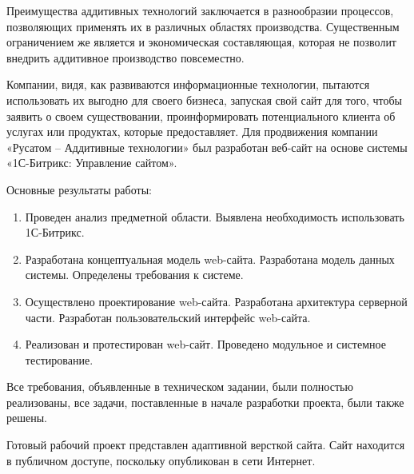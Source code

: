 
Преимущества аддитивных технологий заключается в разнообразии процессов, позволяющих применять их в различных областях производства. Существенным ограничением же является и экономическая составляющая, которая не позволит внедрить аддитивное производство повсеместно.
  
Компании, видя, как развиваются информационные технологии, пытаются использовать их выгодно для своего бизнеса, запуская свой сайт для того, чтобы заявить о своем существовании, проинформировать потенциального клиента об услугах или продуктах, которые предоставляет. 
Для продвижения компании «Русатом – Аддитивные технологии» был разработан веб-сайт на основе системы «1С-Битрикс: Управление сайтом».

Основные результаты работы:

\begin{enumerate}
\item Проведен анализ предметной области. Выявлена необходимость использовать 1С-Битрикс.
\item Разработана концептуальная модель web-сайта. Разработана модель данных системы. Определены требования к системе.
\item Осуществлено проектирование web-сайта. Разработана архитектура серверной части. Разработан пользовательский интерфейс web-сайта.
\item Реализован и протестирован web-сайт. Проведено модульное и системное тестирование.
\end{enumerate}

Все требования, объявленные в техническом задании, были полностью реализованы, все задачи, поставленные в начале разработки проекта, были также решены.

Готовый рабочий проект представлен адаптивной версткой сайта. Сайт находится в публичном доступе, поскольку опубликован в сети Интернет.  
